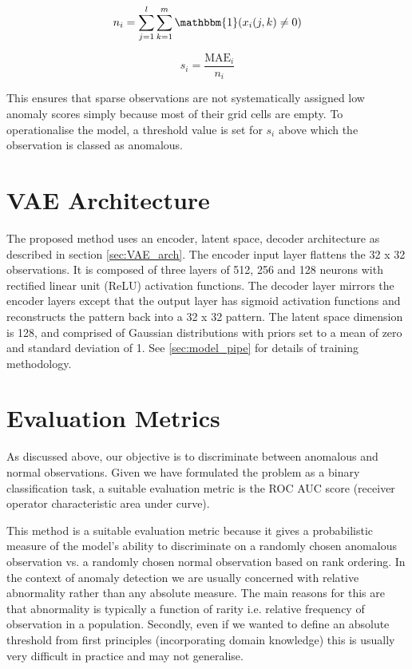 \documentclass{mldsmsc}
\begin{document}
\[
n_i = \sum_{j=1}^{l} \sum_{k=1}^{m} \mathbbm{1}(x_i(j,k) \neq 0)
\]

\[
s_i = \frac{\text{MAE}_i}{n_i}
\]

This ensures that sparse observations are not systematically assigned low anomaly scores simply because most of their grid cells are empty. To operationalise the model, a threshold value is set for $s_i$ above which the observation is classed as anomalous.

\section{VAE Architecture}

The proposed method uses an encoder, latent space, decoder architecture as described in section \ref{sec:VAE_arch}. The encoder input layer flattens the 32 x 32 observations. It  is composed of three layers of 512, 256 and 128 neurons with  rectified linear unit (ReLU) activation functions. The decoder layer mirrors the encoder layers except that the output layer has sigmoid activation functions and reconstructs the pattern back into a 32 x 32 pattern. The latent space dimension is 128, and comprised of Gaussian distributions with priors set to a mean of zero and standard deviation of 1.  See \ref{sec:model_pipe} for details of training methodology. 
 
\section{Evaluation Metrics}

As discussed above, our objective is to discriminate between anomalous and normal observations. Given we have formulated the problem as a binary classification task, a suitable evaluation metric is the ROC AUC score (receiver operator characteristic area under curve).

This method is a suitable evaluation metric because it gives a probabilistic measure of the model's ability to discriminate on a randomly chosen anomalous observation vs. a randomly chosen normal observation based on rank ordering. In the context of anomaly detection we are usually concerned with relative abnormality rather than any absolute measure. The main reasons for this are that abnormality is typically a function of rarity  i.e. relative frequency of observation in a population. Secondly, even if we wanted to define an absolute threshold from first principles (incorporating domain knowledge) this is usually very difficult in practice and may not generalise. 
\end{document}

